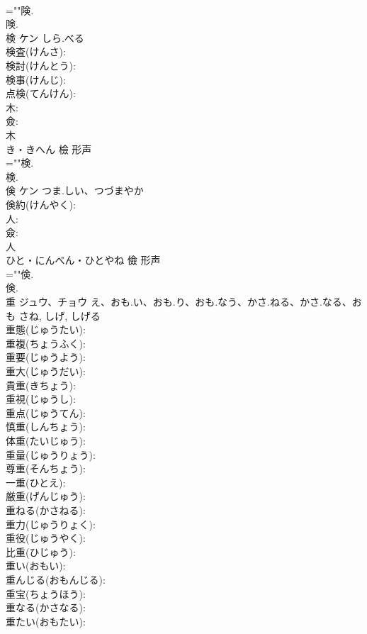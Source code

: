 \documentclass[8pt]{extreport}
\begin{document}
\begin{CJK}{UTF8}{min}
\\	=""険.
\\	険.
\\	検	ケン	しら.べる		
\\	検査(けんさ): 
\\	検討(けんとう): 
\\	検事(けんじ): 
\\	点検(てんけん): 
\\	木: 
\\	僉: 
\\	木	
\\	き・きへん	檢	形声 
\\	=""検.
\\	検.
\\	倹	ケン	つま.しい、つづまやか		
\\	倹約(けんやく): 
\\	人: 
\\	僉: 
\\	人	
\\	ひと・にんべん・ひとやね	儉	形声 
\\	=""倹.
\\	倹.
\\	重	ジュウ、チョウ	え、おも.い、おも.り、おも.なう、かさ.ねる、かさ.なる、おも	さね, しげ, しげる	
\\	重態(じゅうたい): 
\\	重複(ちょうふく): 
\\	重要(じゅうよう): 
\\	重大(じゅうだい): 
\\	貴重(きちょう): 
\\	重視(じゅうし): 
\\	重点(じゅうてん): 
\\	慎重(しんちょう): 
\\	体重(たいじゅう): 
\\	重量(じゅうりょう): 
\\	尊重(そんちょう): 
\\	一重(ひとえ): 
\\	厳重(げんじゅう): 
\\	重ねる(かさねる): 
\\	重力(じゅうりょく): 
\\	重役(じゅうやく): 
\\	比重(ひじゅう): 
\\	重い(おもい): 
\\	重んじる(おもんじる): 
\\	重宝(ちょうほう): 
\\	重なる(かさなる): 
\\	重たい(おもたい): 

\end{CJK}
\end{document}
